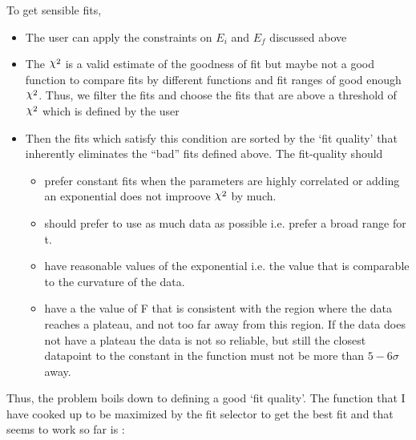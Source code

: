 \documentclass[10pt]{article}
\DeclareRobustCommand{\rchi}{{\mathpalette\irchi\relax}}
\newcommand{\irchi}[2]{\raisebox{\depth}{$#1\chi$}} %
\begin{document}
To get sensible fits,
\begin{itemize}
\item The user can apply the constraints on $E_i$ and $E_f$ discussed above
\item The $\rchi^2$ is a valid estimate of the goodness of fit but maybe not a good function to compare fits by different functions and fit ranges of good enough $\rchi^2$. Thus, we filter the fits and choose the fits that are above a threshold of $\rchi^2$ which is defined by the user
\item Then the fits which satisfy this condition are sorted by the `fit quality' that inherently eliminates the ``bad'' fits defined above. The fit-quality should
\begin{itemize}
	\item prefer constant fits when the parameters are highly correlated or adding an exponential does not improove $\rchi^2$ by much.
	\item should prefer to use as much data as possible i.e. prefer a broad range for t.
	\item have reasonable values of the exponential i.e. the value that is comparable to the curvature of the data.
	\item have a the value of F that is consistent with the region where the data reaches a plateau, and not too far away from this region. If the data does not have a plateau the data is not so reliable, but still the closest datapoint to the constant in the function must not be more than $5-6\sigma$ away.
\end{itemize}
\end{itemize}
Thus, the problem boils down to defining a good `fit quality'. The function that I have cooked up to be maximized by the fit selector to get the best fit and that seems to work so far is : 
\end{document}
